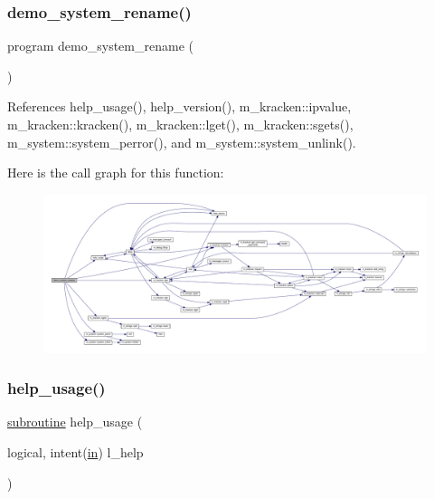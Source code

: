 \subsubsection{\texorpdfstring{demo\+\_\+system\+\_\+rename()}{demo\_system\_rename()}}
{\footnotesize\ttfamily program demo\+\_\+system\+\_\+rename (\begin{DoxyParamCaption}{ }\end{DoxyParamCaption})}



References help\+\_\+usage(), help\+\_\+version(), m\+\_\+kracken\+::ipvalue, m\+\_\+kracken\+::kracken(), m\+\_\+kracken\+::lget(), m\+\_\+kracken\+::sgets(), m\+\_\+system\+::system\+\_\+perror(), and m\+\_\+system\+::system\+\_\+unlink().

Here is the call graph for this function\+:
\nopagebreak
\begin{figure}[H]
\begin{center}
\leavevmode
\includegraphics[width=350pt]{__unlink_8f90_aad99fde3e962ae73c9d6bc3825b8ca79_cgraph}
\end{center}
\end{figure}
\mbox{\label{__unlink_8f90_a3e09a3b52ee8fb04eeb93fe5761626a8}} 
\subsubsection{\texorpdfstring{help\+\_\+usage()}{help\_usage()}}
{\footnotesize\ttfamily \hyperlink{M__stopwatch_83_8txt_acfbcff50169d691ff02d4a123ed70482}{subroutine} help\+\_\+usage (\begin{DoxyParamCaption}\item[{logical, intent(\hyperlink{M__journal_83_8txt_afce72651d1eed785a2132bee863b2f38}{in})}]{l\+\_\+help }\end{DoxyParamCaption})}



